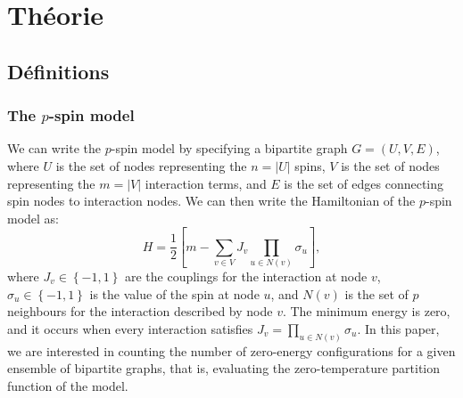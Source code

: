 \begin{comment}
\end{comment}

\part{Théorie}

\chapter{Définitions}



\section{The \texorpdfstring{$p$}{p}-spin model} \label{sec:p-spin}
We can write the $p$-spin model by specifying a bipartite graph $G = (U,V,E)$, where $U$ is the set of nodes representing the $n = |U|$ spins, $V$ is the set of nodes representing the $m = |V|$ interaction terms, and $E$ is the set of edges connecting spin nodes to interaction nodes.
We can then write the Hamiltonian of the $p$-spin model as:
\begin{equation} \label{eq:ham_p-spin}
    H = \frac{1}{2} \left[m -\sum_{v \in V} J_{v}\prod_{u \in N(v)} \sigma_{u} \right],
\end{equation}
where $J_v \in \left\{-1, 1\right\}$ are the couplings for the interaction at node $v$, $\sigma_u \in \left\{-1,1\right\}$ is the value of the spin at node $u$, and $N(v)$ is the set of $p$ neighbours for the interaction described by node $v$.
The minimum energy is zero, and it occurs when every interaction satisfies $J_{v} = \prod_{u \in N(v)} \sigma_{u}$.
In this paper, we are interested in counting the number of zero-energy configurations for a given ensemble of bipartite graphs, that is, evaluating the zero-temperature partition function of the model.

